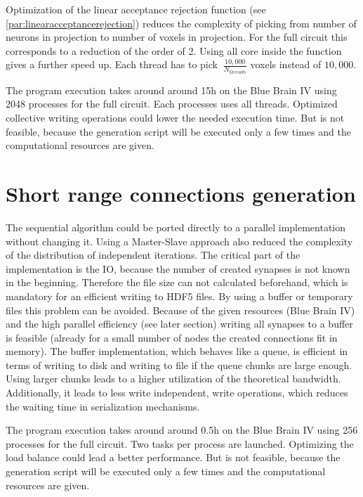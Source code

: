 Optimization of the linear acceptance rejection function (see \ref{par:linearacceptancerejection})
reduces the complexity of picking from number of neurons in projection to number of voxels in projection.
For the full circuit this corresponds to a reduction of the order of 2.
Using all core inside the function gives a further speed up.
Each thread has to pick $~\frac{10,000}{N_{threads}}$ voxels instead of
$10,000$.

The program execution takes around around 15h on the Blue Brain IV using 2048 processes for the full circuit.
Each processes uses all threads. Optimized collective writing operations could 
lower the needed execution time.
But is not feasible, because the generation script will be executed only a few times
and the computational resources are given.



\section{Short range connections generation}
The sequential algorithm could be ported directly to a parallel implementation without changing it.
Using a Master-Slave approach also reduced the complexity of the distribution of independent iterations.
The critical part of the implementation is the IO, because the number of created synapses is not known in the beginning.
Therefore the file size can not calculated beforehand, which is mandatory for an efficient writing to HDF5 files. 
By using a buffer or temporary files this problem can be avoided.
Because of the given resources (Blue Brain IV) and the high parallel efficiency (see later section)
writing all synapses to a buffer is feasible (already for a small number of nodes the created connections fit in memory).
The buffer implementation, which behaves like a queue, is efficient in terms of writing to disk and writing to file
if the queue chunks are large enough. Using larger chunks leads to 
a higher utilization of the theoretical bandwidth. Additionally, it leads to less write independent,
write operations, which reduces the waiting time in serialization mechanisms.

The program execution takes around around 0.5h on the Blue Brain IV using 256 processes for the full circuit.
Two tasks per process are launched. Optimizing the load balance could lead a better performance.
But is not feasible, because the generation script will be executed only a few times
and the computational resources are given.

